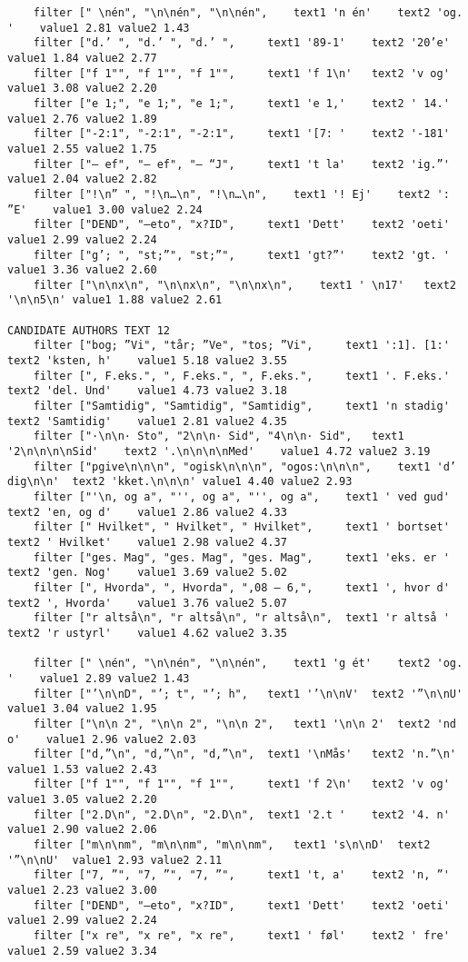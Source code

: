 {\begin{verbatim}
	filter [" \nén", "\n\nén", "\n\nén", 	text1 'n én'	text2 'og. '	value1 2.81	value2 1.43
	filter ["d.’ ", "d.’ ", "d.’ ", 	text1 '89-1'	text2 '20’e'	value1 1.84	value2 2.77
	filter ["f 1"", "f 1"", "f 1"", 	text1 'f 1\n'	text2 'v og'	value1 3.08	value2 2.20
	filter ["e 1;", "e 1;", "e 1;", 	text1 'e 1,'	text2 ' 14.'	value1 2.76	value2 1.89
	filter ["-2:1", "-2:1", "-2:1", 	text1 '[7: '	text2 '-181'	value1 2.55	value2 1.75
	filter ["– ef", "– ef", "– “J", 	text1 't la'	text2 'ig.”'	value1 2.04	value2 2.82
	filter ["!\n” ", "!\n…\n", "!\n…\n", 	text1 '! Ej'	text2 ': ”E'	value1 3.00	value2 2.24
	filter ["DEND", "–eto", "x?ID", 	text1 'Dett'	text2 'oeti'	value1 2.99	value2 2.24
	filter ["g’; ", "st;”", "st;”", 	text1 'gt?”'	text2 'gt. '	value1 3.36	value2 2.60
	filter ["\n\nx\n", "\n\nx\n", "\n\nx\n", 	text1 ' \n17'	text2 '\n\n5\n'	value1 1.88	value2 2.61

CANDIDATE AUTHORS TEXT 12
	filter ["bog; ”Vi", "tår; ”Ve", "tos; ”Vi", 	text1 ':1]. [1:'	text2 'ksten, h'	value1 5.18	value2 3.55
	filter [", F.eks.", ", F.eks.", ", F.eks.", 	text1 '. F.eks.'	text2 'del. Und'	value1 4.73	value2 3.18
	filter ["Samtidig", "Samtidig", "Samtidig", 	text1 'n stadig'	text2 'Samtidig'	value1 2.81	value2 4.35
	filter ["·\n\n· Sto", "2\n\n· Sid", "4\n\n· Sid", 	text1 '2\n\n\n\nSid'	text2 '.\n\n\n\nMed'	value1 4.72	value2 3.19
	filter ["pgive\n\n\n", "ogisk\n\n\n", "ogos:\n\n\n", 	text1 'd’ dig\n\n'	text2 'kket.\n\n\n'	value1 4.40	value2 2.93
	filter ["'\n, og a", "'', og a", "'', og a", 	text1 ' ved gud'	text2 'en, og d'	value1 2.86	value2 4.33
	filter [" Hvilket", " Hvilket", " Hvilket", 	text1 ' bortset'	text2 ' Hvilket'	value1 2.98	value2 4.37
	filter ["ges. Mag", "ges. Mag", "ges. Mag", 	text1 'eks. er '	text2 'gen. Nog'	value1 3.69	value2 5.02
	filter [", Hvorda", ", Hvorda", ",08 – 6,", 	text1 ', hvor d'	text2 ', Hvorda'	value1 3.76	value2 5.07
	filter ["r altså\n", "r altså\n", "r altså\n", 	text1 'r altså '	text2 'r ustyrl'	value1 4.62	value2 3.35

	filter [" \nén", "\n\nén", "\n\nén", 	text1 'g ét'	text2 'og. '	value1 2.89	value2 1.43
	filter ["’\n\nD", "’; t", "’; h", 	text1 '’\n\nV'	text2 '”\n\nU'	value1 3.04	value2 1.95
	filter ["\n\n 2", "\n\n 2", "\n\n 2", 	text1 '\n\n 2'	text2 'nd o'	value1 2.96	value2 2.03
	filter ["d,”\n", "d,”\n", "d,”\n", 	text1 '\nMås'	text2 'n.”\n'	value1 1.53	value2 2.43
	filter ["f 1"", "f 1"", "f 1"", 	text1 'f 2\n'	text2 'v og'	value1 3.05	value2 2.20
	filter ["2.D\n", "2.D\n", "2.D\n", 	text1 '2.t '	text2 '4. n'	value1 2.90	value2 2.06
	filter ["m\n\nm", "m\n\nm", "m\n\nm", 	text1 's\n\nD'	text2 '”\n\nU'	value1 2.93	value2 2.11
	filter ["7, ”", "7, ”", "7, ”", 	text1 't, a'	text2 'n, ”'	value1 2.23	value2 3.00
	filter ["DEND", "–eto", "x?ID", 	text1 'Dett'	text2 'oeti'	value1 2.99	value2 2.24
	filter ["x re", "x re", "x re", 	text1 ' føl'	text2 ' fre'	value1 2.59	value2 3.34


\end{verbatim}}
